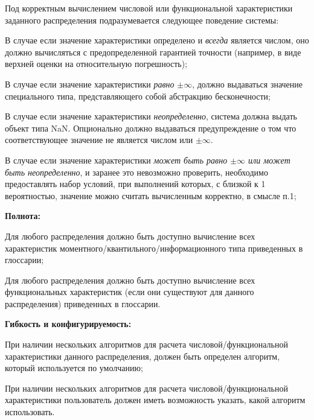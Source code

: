 Под корректным вычислением числовой или функциональной характеристики заданного распределения подразумевается следующее поведение системы:
\begin{enumeratecmp}
    \item В случае если значение характеристики определено и \textit{всегда} является числом, оно должно вычисляться с предопределенной гарантией точности (например, в виде верхней оценки на относительную погрешность);  
    \item В случае если значение характеристики \textit{равно} $\pm \infty$, должно выдаваться значение специального типа, представляющего собой абстракцию бесконечности;
    \item В случае если значение характеристики \textit{неопределенно}, система должна выдать объект типа NaN. Опционально должно выдаваться предупреждение о том что соответствующее значение не является числом или $\pm\infty$.
    \item В случае если значение характеристики \textit{может быть равно $\pm \infty$ или может быть неопределенно}, и заранее это невозможно проверить, необходимо предоставлять набор условий, при выполнений которых, с близкой к 1 вероятностью, значение можно считать вычисленным корректно, в смысле п.1;
\end{enumeratecmp}

\textbf{Полнота:}
\begin{itemizecmp}
    \item Для любого распределения должно быть доступно вычисление всех характеристик моментного/квантильного/информационного типа приведенных в глоссарии;
    \item Для любого распределения должно быть доступно вычисление всех функциональных характеристик (если они существуют для данного распределения) приведенных в глоссарии.
\end{itemizecmp}

\textbf{Гибкость и конфигурируемость:}
\begin{itemizecmp}
    \item При наличии нескольких алгоритмов для расчета числовой/функциональной характеристики данного распределения, должен быть определен алгоритм, который используется по умолчанию;
    \item При наличии нескольких алгоритмов для расчета числовой/функциональной характеристики пользователь должен иметь возможность указать, какой алгоритм использовать.
\end{itemizecmp}

